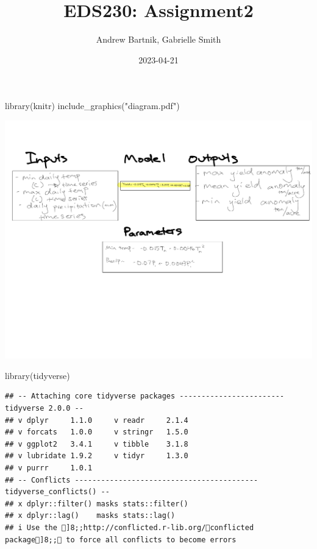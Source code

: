 \documentclass[
]{article}
\title{EDS230: Assignment2}
\author{Andrew Bartnik, Gabrielle Smith}
\date{2023-04-21}
\newenvironment{Shaded}{\begin{snugshade}}{\end{snugshade}}
\newcommand{\FunctionTok}[1]{\textcolor[rgb]{0.00,0.00,0.00}{#1}}
\newcommand{\NormalTok}[1]{#1}
\newcommand{\StringTok}[1]{\textcolor[rgb]{0.31,0.60,0.02}{#1}}
\begin{document}
\maketitle

\begin{Shaded}
\begin{Highlighting}[]
\FunctionTok{library}\NormalTok{(knitr)}
\FunctionTok{include\_graphics}\NormalTok{(}\StringTok{"diagram.pdf"}\NormalTok{)}
\end{Highlighting}
\end{Shaded}

\includegraphics{diagram.pdf}

\begin{Shaded}
\begin{Highlighting}[]
\FunctionTok{library}\NormalTok{(tidyverse)}
\end{Highlighting}
\end{Shaded}

\begin{verbatim}
## -- Attaching core tidyverse packages ------------------------ tidyverse 2.0.0 --
## v dplyr     1.1.0     v readr     2.1.4
## v forcats   1.0.0     v stringr   1.5.0
## v ggplot2   3.4.1     v tibble    3.1.8
## v lubridate 1.9.2     v tidyr     1.3.0
## v purrr     1.0.1     
## -- Conflicts ------------------------------------------ tidyverse_conflicts() --
## x dplyr::filter() masks stats::filter()
## x dplyr::lag()    masks stats::lag()
## i Use the ]8;;http://conflicted.r-lib.org/conflicted package]8;; to force all conflicts to become errors
\end{verbatim}
\end{document}
